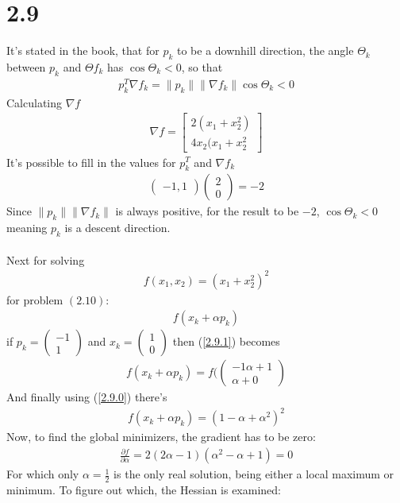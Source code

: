 \documentclass[11pt]{article} %
\begin{document}
\section*{2.9}
It's stated in the book, that for $p_k$ to be a downhill direction, the angle $\Theta_k$ between $p_k$ and  $\Theta f_k$ has $\cos \Theta_k < 0$, so that
\begin{gather}
p_k^T \nabla f_k = \lVert p_k \rVert \lVert \nabla f_k \rVert \cos \Theta_k < 0
\end{gather}
Calculating $\nabla f$
\begin{gather*}
\nabla f = \begin{bmatrix}2(x_1 + x_2^2) \\ 4x_2 (x_1 + x_2^2 \end{bmatrix}
\end{gather*}
It's possible to fill in the values for $p_k ^ T$ and $\nabla f_k$
\begin{gather*}
\begin{pmatrix}-1, 1\end{pmatrix}\begin{pmatrix}2 \\ 0\end{pmatrix} = -2
\end{gather*}
Since $\lVert p_k \rVert \lVert \nabla f_k \rVert$ is always positive, for the result to be $-2$, $\cos \Theta_k < 0$
meaning $p_k$ is a descent direction.
\\
~
\\
Next for solving
\begin{gather}
\label{2.9.0}
f(x_1, x_2) = (x_1 + x_2^2)^2
\end{gather}
for problem $(2.10)$:
\begin{gather}
\label{2.9.1}
f(x_k + \alpha p_k)
\end{gather}
if $p_k = \begin{pmatrix}-1 \\ 1\end{pmatrix}$ and $x_k = \begin{pmatrix}1 \\ 0\end{pmatrix}$ then (\ref{2.9.1}) becomes
\begin{gather*}
f(x_k + \alpha p_k)  = f(\begin{pmatrix}-1\alpha + 1\\ \alpha + 0\end{pmatrix}
\end{gather*}
And finally using (\ref{2.9.0}) there's
\begin{gather*}
f(x_k + \alpha p_k) = (1-\alpha + \alpha^2)^2
\end{gather*}
Now, to find the global minimizers, the gradient has to be zero:
\begin{gather*}
\frac{\partial f}{\partial \alpha} = 2(2\alpha -1) (\alpha^2 - \alpha +1) = 0
\end{gather*}
For which only $\alpha = \frac{1}{2}$ is the only real solution, being either a local maximum or minimum. To figure out which, the Hessian is examined:
\end{document}
